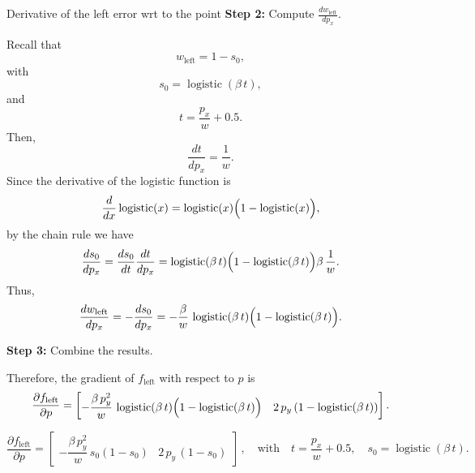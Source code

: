 \documentclass[11pt]{article}
\begin{document}
\begin{section}{Derivative of the left error wrt to the point}
    \textbf{Step 2:} Compute \(\frac{d w_{\mathrm{left}}}{d p_x}\).

    Recall that
    \begin{equation}
        w_{\mathrm{left}} = 1 - s_0,
    \end{equation}
    with
    \begin{equation}
        s_0 = \operatorname{logistic}(\beta\, t),
    \end{equation}
    and
    \begin{equation}
        t = \frac{p_x}{w} + 0.5.
    \end{equation}
    Then,
    \begin{equation}
        \frac{d t}{d p_x} = \frac{1}{w}.
    \end{equation}
    Since the derivative of the logistic function is
    \begin{equation}
        \frac{d}{dx}\operatorname{logistic}(x) = \operatorname{logistic}(x)\Bigl(1-\operatorname{logistic}(x)\Bigr),
    \end{equation}
    by the chain rule we have
    \begin{equation}
        \frac{d s_0}{d p_x} = \frac{d s_0}{d t}\frac{d t}{d p_x} = \operatorname{logistic}(\beta\,t)\Bigl(1-\operatorname{logistic}(\beta\,t)\Bigr)\beta\,\frac{1}{w}.
    \end{equation}
    Thus,
    \begin{equation}
        \frac{d w_{\mathrm{left}}}{d p_x} = - \frac{d s_0}{d p_x} = -\frac{\beta}{w}\, \operatorname{logistic}(\beta\,t)\Bigl(1-\operatorname{logistic}(\beta\,t)\Bigr).
    \end{equation}

    \textbf{Step 3:} Combine the results.

    Therefore, the gradient of \(f_{\mathrm{left}}\) with respect to \(p\) is
    \begin{equation}
        \frac{\partial f_{\mathrm{left}}}{\partial p} =
        \begin{bmatrix}
            -\dfrac{\beta\, p_y^2}{w}\, \operatorname{logistic}(\beta\,t)\Bigl(1-\operatorname{logistic}(\beta\,t)\Bigr) & 2\,p_y\,(1-\operatorname{logistic}(\beta\,t))
        \end{bmatrix}.
    \end{equation}

    \begin{equation}
        \boxed
        {
            \frac{\partial f_{\mathrm{left}}}{\partial p} =
                \begin{bmatrix}
                    -\dfrac{\beta\, p_y^2}{w}\, s_0(1-s_0) & 2\,p_y\,(1-s_0)
                \end{bmatrix}\,,
        }
      \quad \text{with} \quad t = \frac{p_x}{w}+0.5,\quad s_0 = \operatorname{logistic}(\beta\,t).
    \end{equation}
\end{section}
\end{document}
